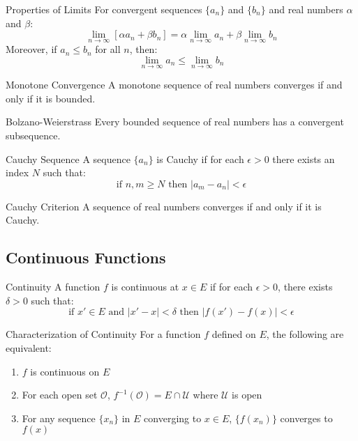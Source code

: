 \begin{theorembox}{Properties of Limits}
For convergent sequences $\{a_n\}$ and $\{b_n\}$ and real numbers $\alpha$ and $\beta$:
\[ \lim_{n \to \infty} [\alpha a_n + \beta b_n] = \alpha \lim_{n \to \infty} a_n + \beta \lim_{n \to \infty} b_n \]
Moreover, if $a_n \leq b_n$ for all $n$, then:
\[ \lim_{n \to \infty} a_n \leq \lim_{n \to \infty} b_n \]
\end{theorembox}

\begin{theorembox}{Monotone Convergence}
A monotone sequence of real numbers converges if and only if it is bounded.
\end{theorembox}

\begin{theorembox}{Bolzano-Weierstrass}
Every bounded sequence of real numbers has a convergent subsequence.
\end{theorembox}

\begin{definitionbox}{Cauchy Sequence}
A sequence $\{a_n\}$ is Cauchy if for each $\epsilon > 0$ there exists an index $N$ such that:
\[ \text{if } n,m \geq N \text{ then } |a_m - a_n| < \epsilon \]
\end{definitionbox}

\begin{theorembox}{Cauchy Criterion}
A sequence of real numbers converges if and only if it is Cauchy.
\end{theorembox}

\subsection{Continuous Functions}

\begin{definitionbox}{Continuity}
A function $f$ is continuous at $x \in E$ if for each $\epsilon > 0$, there exists $\delta > 0$ such that:
\[ \text{if } x' \in E \text{ and } |x'-x| < \delta \text{ then } |f(x')-f(x)| < \epsilon \]
\end{definitionbox}

\begin{theorembox}{Characterization of Continuity}
For a function $f$ defined on $E$, the following are equivalent:
\begin{enumerate}[label=(\roman*)]
\item $f$ is continuous on $E$
\item For each open set $\mathcal{O}$, $f^{-1}(\mathcal{O}) = E \cap \mathcal{U}$ where $\mathcal{U}$ is open
\item For any sequence $\{x_n\}$ in $E$ converging to $x \in E$, $\{f(x_n)\}$ converges to $f(x)$
\end{enumerate}
\end{theorembox}

